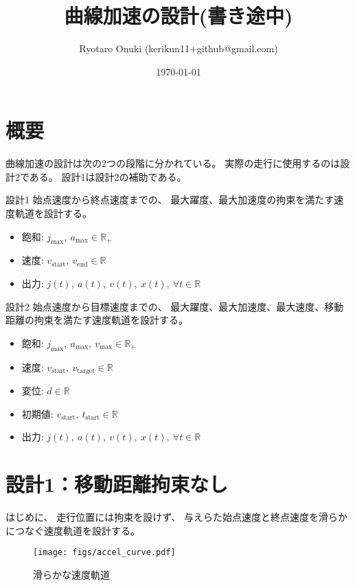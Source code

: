 \documentclass[a5paper]{ltjsarticle}
\title{曲線加速の設計(書き途中)}
\author{Ryotaro Onuki (kerikun11+github@gmail.com)}
\date{\today}
\begin{document}
\maketitle
\section{概要}
曲線加速の設計は次の2つの段階に分かれている。
実際の走行に使用するのは設計2である。
設計1は設計2の補助である。
\begin{itembox}[l]{設計1}
    \quad
    始点速度から終点速度までの、
    最大躍度、最大加速度の拘束を満たす速度軌道を設計する。
    \begin{itemize}
        \item 飽和: $j_{\max},~ a_{\max} \in \mathbb{R}_+$
        \item 速度: $v_\mathrm{start},~ v_\mathrm{end} \in \mathbb{R}$
        \item 出力: $j(t),~ a(t),~ v(t),~ x(t),~ \forall t \in \mathbb{R}$
    \end{itemize}
\end{itembox}
\begin{itembox}[l]{設計2}
    \quad
    始点速度から目標速度までの、
    最大躍度、最大加速度、最大速度、移動距離の拘束を満たす速度軌道を設計する。
    \begin{itemize}
        \item 飽和: $j_{\max},~ a_{\max},~ v_{\max} \in \mathbb{R}_+$
        \item 速度: $v_\mathrm{start},~ v_\mathrm{target} \in \mathbb{R}$
        \item 変位: $d \in \mathbb{R}$
        \item 初期値: $v_\mathrm{start},~ t_\mathrm{start} \in \mathbb{R}$
        \item 出力: $j(t),~ a(t),~ v(t),~ x(t),~ \forall t \in \mathbb{R}$
    \end{itemize}
\end{itembox}
\section{設計1：移動距離拘束なし}
はじめに、
走行位置には拘束を設けず、
与えらた始点速度と終点速度を滑らかにつなぐ速度軌道を設計する。
\begin{figure}[htbp]
    \centering
    \texttt{[image: figs/accel\_curve.pdf]}
    \caption{滑らかな速度軌道}
\end{figure}
\end{document}
